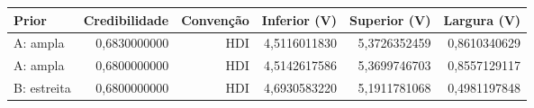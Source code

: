 \begin{tabular}{lrrrrr}
\toprule
Prior & Credibilidade & Convenção & Inferior (V) & Superior (V) & Largura (V) \\
\midrule
A: ampla & 0,6830000000 & HDI & 4,5116011830 & 5,3726352459 & 0,8610340629 \\
A: ampla & 0,6800000000 & HDI & 4,5142617586 & 5,3699746703 & 0,8557129117 \\
B: estreita & 0,6800000000 & HDI & 4,6930583220 & 5,1911781068 & 0,4981197848 \\
\bottomrule
\end{tabular}
